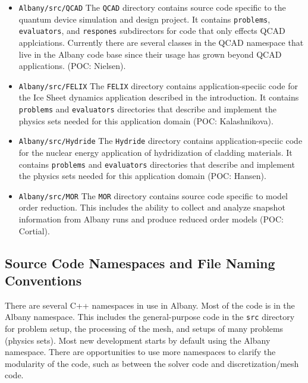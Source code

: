 \documentclass[pdf,12pt,report,strict]{SANDreport}
\theoremstyle{remark}
\begin{document}
\begin{itemize}
\item{\texttt{Albany/src/QCAD}}  The \texttt{QCAD} directory contains source code specific
to the quantum device simulation and design project. It contains \texttt{problems}, 
\texttt{evaluators}, and \texttt{respones} subdirectors for code that only effects
QCAD applciations. Currently there are several classes in the QCAD namespace that live
in the Albany code base since their usage has grown beyond QCAD applications.
(POC: Nielsen). 

\item{\texttt{Albany/src/FELIX}}  The \texttt{FELIX} directory contains application-speciic
code for the Ice Sheet dynamics application described in the introduction. It contains
 \texttt{problems} and \texttt{evaluators} directories that describe and implement
the physics sets needed for this application domain (POC: Kalashnikova).

\item{\texttt{Albany/src/Hydride}}  The \texttt{Hydride} directory contains application-speciic
code for the nuclear energy application of hydridization of cladding materials. It contains
 \texttt{problems} and \texttt{evaluators} directories that describe and implement
the physics sets needed for this application domain (POC: Hansen).

\item{\texttt{Albany/src/MOR}}  The \texttt{MOR} directory contains source code specific
to model order reduction. This includes the ability to collect and analyze snapshot
information from Albany runs and produce reduced order models (POC: Cortial). 

\end{itemize}
  
\subsection{Source Code Namespaces and File Naming Conventions}

There are several C++ namespaces in use in Albany. Most of the code
is in the Albany namespace. This includes the general-purpose code in
the \texttt{src} directory for problem setup, the processing of the
mesh, and setups of many problems (physics sets). Most new development
starts by default using the Albany namespace. There are opportunities
to use more namespaces to clarify the modularity of the code, such
as between the solver code and discretization/mesh code. 
\end{document}
